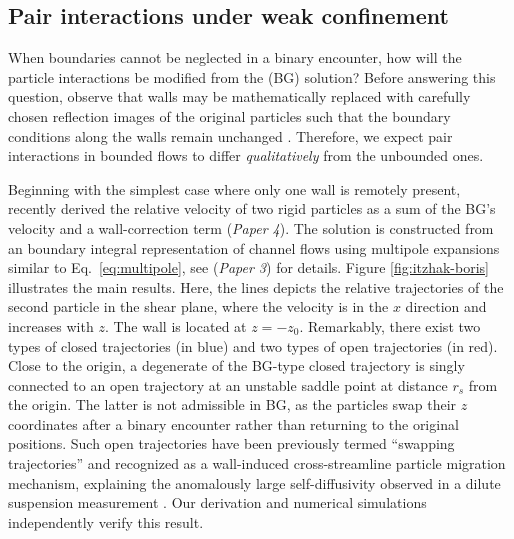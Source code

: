 \subsection{Pair interactions under weak confinement}

When boundaries cannot be neglected in a binary encounter, how will the particle interactions be modified from the \cite{batchelor_green_1972} (BG) solution?
Before answering this question, observe that walls may be mathematically replaced with carefully chosen reflection images of the original particles such that the boundary conditions along the walls remain unchanged \citep{blake_1971, LironMochon}.
Therefore, we expect pair interactions in bounded flows to differ \emph{qualitatively} from the unbounded ones.

Beginning with the simplest case where only one wall is remotely present, \cite{Fouxon_Rubinstein2019} recently derived the relative velocity of two rigid particles as a sum of the BG's velocity and a wall-correction term (\emph{Paper 4}). The solution is constructed from an boundary integral representation of channel flows using multipole expansions similar to Eq.\ \eqref{eq:multipole}, see \cite{Fouxon_2017} (\emph{Paper 3}) for details.
Figure \ref{fig:itzhak-boris} illustrates the main results.
Here, the lines depicts the relative trajectories of the second particle in the shear plane, where the velocity is in the $x$ direction and increases with $z$. The wall is located at $z=-z_0$.
Remarkably, there exist two types of closed trajectories (in blue) and two types of open trajectories (in red).
Close to the origin, a degenerate of the BG-type closed trajectory is singly connected to an open trajectory at an unstable saddle point at distance $r_s$ from the origin.
The latter is not admissible in BG, as the particles swap their $z$ coordinates after a binary encounter rather than returning to the original positions.
Such open trajectories have been previously termed ``swapping trajectories'' and recognized as a wall-induced cross-streamline particle migration mechanism, explaining the anomalously large self-diffusivity observed in a dilute suspension measurement \citep{Zarraga_Leighton2002, zurita-gotor_2007}.
Our derivation and numerical simulations independently verify this result.

